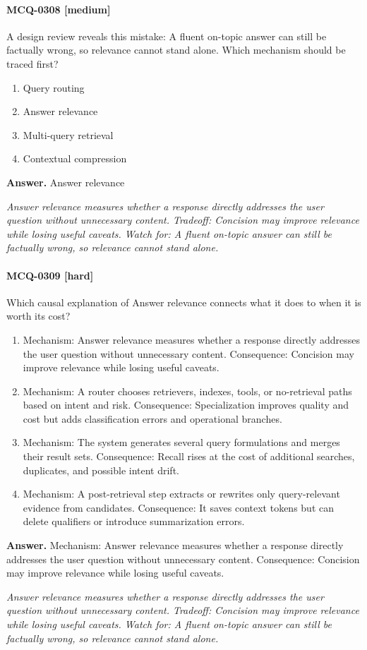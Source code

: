 \paragraph{MCQ-0308 [medium]} A design review reveals this mistake: A fluent on-topic answer can still be factually wrong, so relevance cannot stand alone. Which mechanism should be traced first?
\begin{enumerate}[label=\Alph*.]
\item Query routing
\item Answer relevance
\item Multi-query retrieval
\item Contextual compression
\end{enumerate}
\noindent\textbf{Answer.} Answer relevance
\par\textit{Answer relevance measures whether a response directly addresses the user question without unnecessary content. Tradeoff: Concision may improve relevance while losing useful caveats. Watch for: A fluent on-topic answer can still be factually wrong, so relevance cannot stand alone.}
\paragraph{MCQ-0309 [hard]} Which causal explanation of Answer relevance connects what it does to when it is worth its cost?
\begin{enumerate}[label=\Alph*.]
\item Mechanism: Answer relevance measures whether a response directly addresses the user question without unnecessary content. Consequence: Concision may improve relevance while losing useful caveats.
\item Mechanism: A router chooses retrievers, indexes, tools, or no-retrieval paths based on intent and risk. Consequence: Specialization improves quality and cost but adds classification errors and operational branches.
\item Mechanism: The system generates several query formulations and merges their result sets. Consequence: Recall rises at the cost of additional searches, duplicates, and possible intent drift.
\item Mechanism: A post-retrieval step extracts or rewrites only query-relevant evidence from candidates. Consequence: It saves context tokens but can delete qualifiers or introduce summarization errors.
\end{enumerate}
\noindent\textbf{Answer.} Mechanism: Answer relevance measures whether a response directly addresses the user question without unnecessary content. Consequence: Concision may improve relevance while losing useful caveats.
\par\textit{Answer relevance measures whether a response directly addresses the user question without unnecessary content. Tradeoff: Concision may improve relevance while losing useful caveats. Watch for: A fluent on-topic answer can still be factually wrong, so relevance cannot stand alone.}
